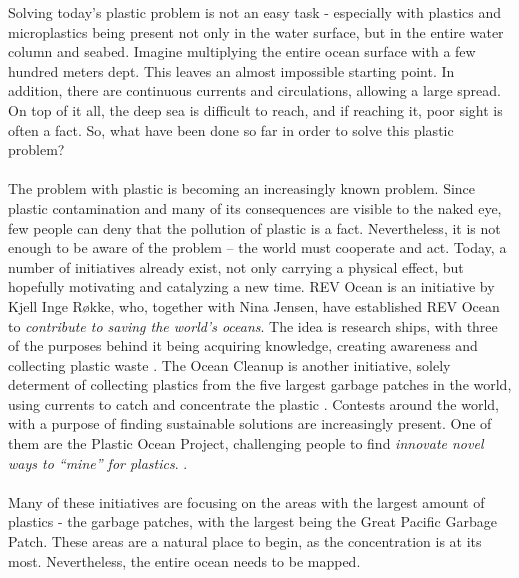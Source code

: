 \noindent
Solving today’s plastic problem is not an easy task - especially with plastics and microplastics being present not only in the water surface, but in the entire water column and seabed. Imagine multiplying the entire ocean surface with a few hundred meters dept. This leaves an almost impossible starting point. In addition, there are continuous currents and circulations, allowing a large spread. On top of it all, the deep sea is difficult to reach, and if reaching it, poor sight is often a fact. So, what have been done so far in order to solve this plastic problem?
\\\\
The problem with plastic is becoming an increasingly known problem. Since plastic contamination and many of its consequences are visible to the naked eye, few people can deny that the pollution of plastic is a fact. Nevertheless, it is not enough to be aware of the problem – the world must cooperate and act. Today, a number of initiatives already exist, not only carrying a physical effect, but hopefully motivating and catalyzing a new time. REV Ocean is an initiative by Kjell Inge R{\o}kke, who, together with Nina Jensen, have established REV Ocean to \textit{contribute to saving the world’s oceans}. The idea is research ships, with three of the purposes behind it being acquiring knowledge, creating awareness and collecting plastic waste . The Ocean Cleanup is another initiative, solely determent of collecting plastics from the five largest garbage patches in the world, using currents to catch and concentrate the plastic . Contests around the world, with a purpose of finding sustainable solutions are increasingly present. One of them are the Plastic Ocean Project, challenging people to find \textit{innovate novel ways to “mine” for plastics}. .
\\\\
Many of these initiatives are focusing on the areas with the largest amount of plastics - the garbage patches, with the largest being the Great Pacific Garbage Patch.   These areas are a natural place to begin, as the concentration is at its most. Nevertheless, the entire ocean needs to be mapped. %

